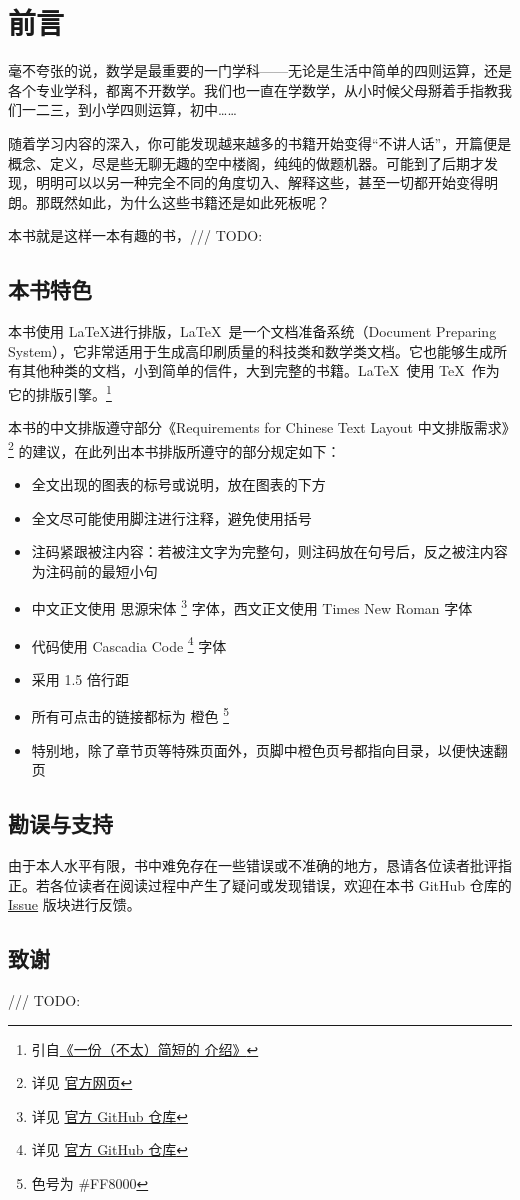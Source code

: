 \chapter{前言}

毫不夸张的说，数学是最重要的一门学科——无论是生活中简单的四则运算，还是各个专业学科，都离不开数学。我们也一直在学数学，从小时候父母掰着手指教我们一二三，到小学四则运算，初中……

随着学习内容的深入，你可能发现越来越多的书籍开始变得“不讲人话”，开篇便是概念、定义，尽是些无聊无趣的空中楼阁，纯纯的做题机器。可能到了后期才发现，明明可以以另一种完全不同的角度切入、解释这些，甚至一切都开始变得明朗。那既然如此，为什么这些书籍还是如此死板呢？

本书就是这样一本有趣的书，/// TODO:

\section*{本书特色}

本书使用 \LaTeX 进行排版，\LaTeX\ 是一个文档准备系统（Document Preparing System），它非常适用于生成高印刷质量的科技类和数学类文档。它也能够生成所有其他种类的文档，小到简单的信件，大到完整的书籍。\LaTeX\ 使用 \TeX\ 作为它的排版引擎。\footnote{引自\href{https://github.com/CTeX-org/lshort-zh-cn/}{《一份（不太）简短的 \LaTeXe 介绍》}}

本书的中文排版遵守部分《Requirements for Chinese Text Layout 中文排版需求》\footnote{详见 \href{https://w3c.github.io/clreq}{官方网页}} 的建议，在此列出本书排版所遵守的部分规定如下：

\begin{itemize}
  \item 全文出现的图表的标号或说明，放在图表的下方
  \item 全文尽可能使用脚注进行注释，避免使用括号
  \item 注码紧跟被注内容：若被注文字为完整句，则注码放在句号后，反之被注内容为注码前的最短小句
  \item 中文正文使用 思源宋体 \footnote{详见 \href{https://github.com/adobe-fonts/source-han-serif}{官方 GitHub 仓库}} 字体，西文正文使用 Times New Roman 字体
  \item 代码使用 Cascadia Code \footnote{详见 \href{https://github.com/microsoft/cascadia-code}{官方 GitHub 仓库}} 字体
  \item 采用 1.5 倍行距
  \item 所有可点击的链接都标为 {\color{orange} 橙色} \footnote{色号为 \#FF8000}
  \item 特别地，除了章节页等特殊页面外，页脚中橙色页号都指向目录，以便快速翻页
\end{itemize}

\section*{勘误与支持}

由于本人水平有限，书中难免存在一些错误或不准确的地方，恳请各位读者批评指正。若各位读者在阅读过程中产生了疑问或发现错误，欢迎在本书 GitHub 仓库的 \href{https://github.com/Cierra-Runis/math/issues}{Issue} 版块进行反馈。

\section*{致谢}

/// TODO:
